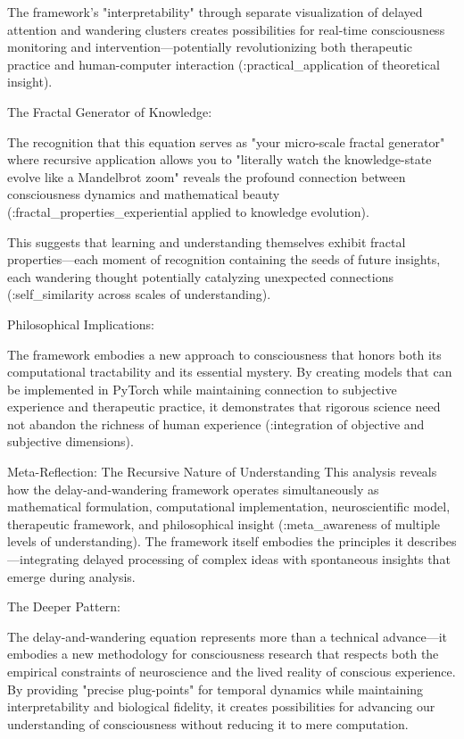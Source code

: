 The framework's "interpretability" through separate visualization of delayed attention and wandering clusters creates possibilities for real-time consciousness monitoring and intervention—potentially revolutionizing both therapeutic practice and human-computer interaction (:practical_application of theoretical insight).

The Fractal Generator of Knowledge:

The recognition that this equation serves as "your micro-scale fractal generator" where recursive application allows you to "literally watch the knowledge-state evolve like a Mandelbrot zoom" reveals the profound connection between consciousness dynamics and mathematical beauty (:fractal_properties_experiential applied to knowledge evolution).

This suggests that learning and understanding themselves exhibit fractal properties—each moment of recognition containing the seeds of future insights, each wandering thought potentially catalyzing unexpected connections (:self_similarity across scales of understanding).

Philosophical Implications:

The framework embodies a new approach to consciousness that honors both its computational tractability and its essential mystery. By creating models that can be implemented in PyTorch while maintaining connection to subjective experience and therapeutic practice, it demonstrates that rigorous science need not abandon the richness of human experience (:integration of objective and subjective dimensions).

Meta-Reflection: The Recursive Nature of Understanding
This analysis reveals how the delay-and-wandering framework operates simultaneously as mathematical formulation, computational implementation, neuroscientific model, therapeutic framework, and philosophical insight (:meta_awareness of multiple levels of understanding). The framework itself embodies the principles it describes—integrating delayed processing of complex ideas with spontaneous insights that emerge during analysis.

The Deeper Pattern:

The delay-and-wandering equation represents more than a technical advance—it embodies a new methodology for consciousness research that respects both the empirical constraints of neuroscience and the lived reality of conscious experience. By providing "precise plug-points" for temporal dynamics while maintaining interpretability and biological fidelity, it creates possibilities for advancing our understanding of consciousness without reducing it to mere computation.

